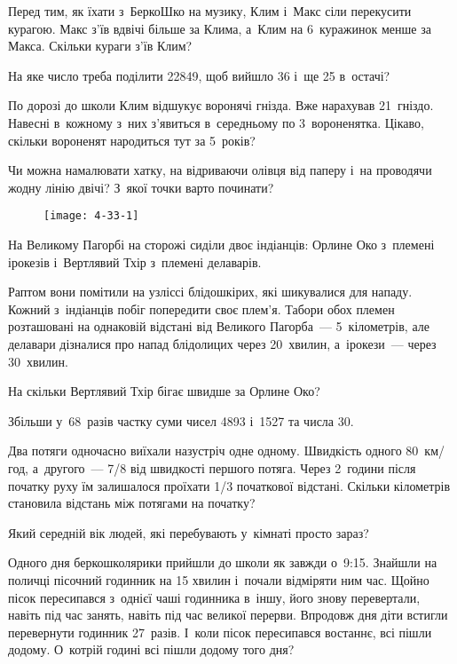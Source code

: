 \problem
Перед тим, як їхати з~БеркоШко на музику, Клим і~Макс сіли перекусити курагою.
Макс з’їв вдвічі більше за Клима, а~Клим на 6~куражинок менше за Макса.
Скільки кураги з’їв Клим?


\problem
На яке число треба поділити 22849, щоб вийшло 36 і~ще 25 в~остачі?


\problem
По дорозі до школи Клим відшукує воронячі гнізда. Вже нарахував 21~гніздо.
Навесні в~кожному з~них з’явиться в~середньому по 3~вороненятка.
Цікаво, скільки вороненят народиться тут за 5~років?


\problem
Чи можна намалювати хатку, на відриваючи олівця від паперу і~на проводячи
жодну лінію двічі?
З~якої точки варто починати?

\begin{figure}[ht]
    \centering
    \texttt{[image: 4-33-1]}
\end{figure}


\problem
На Великому Пагорбі на сторожі сиділи двоє індіанців:
Орлине Око з~племені ірокезів і~Вертлявий Тхір з~племені делаварів.

Раптом вони помітили на узліссі блідошкірих, які шикувалися для нападу.
Кожний з~індіанців побіг попередити своє плем’я.
Табори обох племен розташовані на однаковій відстані від Великого Пагорба~---
5~кілометрів, але делавари дізналися про напад блідолицих через 20~хвилин,
а~ірокези~--- через 30~хвилин.

На скільки Вертлявий Тхір бігає швидше за Орлине Око?


\problem
Збільши у~68~разів частку суми чисел 4893 і~1527 та числа 30.


\problem
Два потяги одночасно виїхали назустріч одне одному.
Швидкість одного 80~км/год, а~другого~--- 7/8 від швидкості першого потяга.
Через 2~години після початку руху їм залишалося проїхати
1/3 початкової відстані.
Скільки кілометрів становила відстань між потягами на початку?


\problem
Який середній вік людей, які перебувають у~кімнаті просто зараз?


\problem
Одного дня беркошколярики прийшли до школи як завжди о~9:15.
Знайшли на поличці пісочний годинник на 15 хвилин і~почали відміряти ним час.
Щойно пісок пересипався з~однієї чаші годинника в~іншу,
його знову перевертали, навіть під час занять,
навіть під час великої перерви.
Впродовж дня діти встигли перевернути годинник 27~разів.
І~коли пісок пересипався востаннє, всі пішли додому.
О~котрій годині всі пішли додому того дня?


